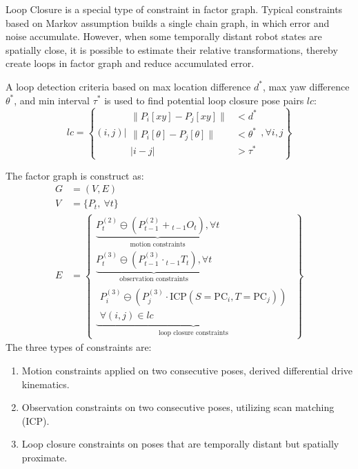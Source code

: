\documentclass[conference]{IEEEtran}
\begin{document}
Loop Closure is a special type of constraint in factor graph.
Typical constraints based on Markov assumption builds a single chain graph, 
in which error and noise accumulate.
However, when some temporally distant robot states are spatially close,
it is possible to estimate their relative transformations,
thereby create loops in factor graph and reduce accumulated error.

A loop detection criteria based on max location difference $d^*$, 
max yaw difference $\theta^*$, and min interval $\tau^*$
is used to find potential loop closure pose pairs $lc$:
$$
lc = \left\{(i, j) \bigg| 
\begin{aligned}
    \| P_{i}[xy]-P_{j}[xy]\| &< d^*\\ 
    \| P_{i}[\theta]-P_{j}[\theta]\| &< \theta^* \\
    |i-j|&>\tau^*
\end{aligned} 
, \forall i, j\right\}
$$

The factor graph is construct as:
$$
\begin{aligned}
G &= (V, E) \\
V &= \{ P_{t},\ \forall t\} \\
E &= \left\{ \begin{gathered}
\underbrace{P_{t}^{(2)} \ominus \left(P_{t-1}^{(2)} + {}_{t-1}O_{t} \right),\forall t}_{\text{motion constraints}} \\
\underbrace{P_{t}^{(3)} \ominus \left(P_{t-1}^{(3)} \cdot {}_{t-1}T_{t} \right),\forall t}_{\text{observation constraints}} \\
\underbrace{\begin{gathered} P_{i}^{(3)} \ominus \left(P_{j}^{(3)} \cdot \text{ICP}(S=\mathrm{PC}_{i}, T=\mathrm{PC}_{j}) \right) \\ \forall (i,j) \in lc \end{gathered}}_{\text{loop closure constraints}}
\end{gathered} \right\}
\end{aligned}
$$
The three types of constraints are:
\begin{enumerate}
\item Motion constraints applied on two consecutive poses, derived differential drive kinematics.
\item Observation constraints on two consecutive poses, utilizing scan matching (ICP).
\item Loop closure constraints on poses that are temporally distant but spatially proximate.
\end{enumerate}
\end{document}
